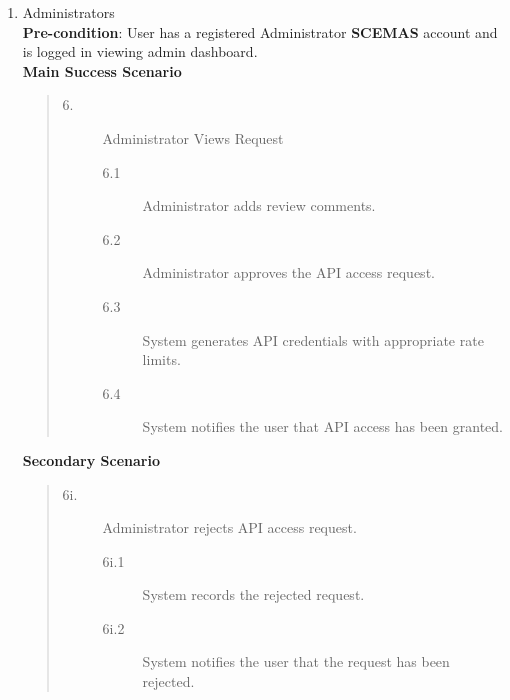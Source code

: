 \documentclass[]{article}
\begin{document}
\begin{enumerate}[{\bf BE7.}]
\begin{enumerate}[{\bf VP1.}]
            \item Administrators \\
                \textbf{Pre-condition}: User has a registered Administrator \textbf{SCEMAS} account and is logged in viewing admin dashboard.\\
                \textbf{Main Success Scenario}
                \begin{quote}
                    \begin{description}
                        \item[\textmd{6.}] Administrator Views Request
                        \begin{description}
                            \item[\textmd{6.1}] Administrator adds review comments.
                            \item[\textmd{6.2}] Administrator approves the API access request.
                            \item[\textmd{6.3}] System generates API credentials with appropriate rate limits.
                            \item[\textmd{6.4}] System notifies the user that API access has been granted.
                        \end{description}
                    \end{description}
                \end{quote}

                \textbf{Secondary Scenario}
                \begin{quote}
                    \begin{description}
                        \item[\textmd{6i.}] Administrator rejects API access request.
                        \begin{description}
                            \item[\textmd{6i.1}] System records the rejected request.
                            \item[\textmd{6i.2}] System notifies the user that the request has been rejected.
                        \end{description}
                    \end{description}
                \end{quote}


\end{enumerate}
\end{enumerate}
\end{document}
